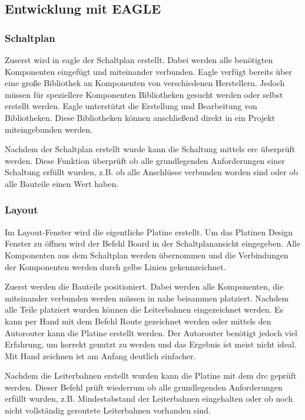\documentclass[a4paper, twoside, 12pt, openright]{memoir}
\begin{document}
\subsection{Entwicklung mit EAGLE}
\subsubsection{Schaltplan}
Zuserst wird in \ac{eagle} der Schaltplan erstellt.
Dabei werden alle benötigten Komponenten eingefügt und miteinander verbunden.
Eagle verfügt bereits über eine große Bibliothek an Komponenten von verschiedenen Herstellern.
Jedoch müssen für speziellere Komponenten Bibliotheken gesucht werden oder selbst erstellt werden.
Eagle unterstützt die Erstellung und Bearbeitung von Bibliotheken.
Diese Bibliotheken können anschließend direkt in ein Projekt miteingebunden werden.\par

Nachdem der Schaltplan erstellt wurde kann die Schaltung mittels \ac{erc} überprüft werden.
Diese Funktion überprüft ob alle grundlegenden Anforderungen einer Schaltung erfüllt wurden, z.B. ob alle Anschlüsse verbunden worden sind oder ob alle Bauteile einen Wert haben.

\subsubsection{Layout}
Im Layout-Fenster wird die eigentliche Platine erstellt.
Um das Platinen Design Fenster zu öffnen wird der Befehl Board in der Schaltplanansicht eingegeben.
Alle Komponenten aus dem Schaltplan werden übernommen und die Verbindungen der Komponenten werden durch gelbe Linien gekennzeichnet.\par

Zuerst werden die Bauteile positioniert. Dabei werden alle Komponenten, die miteinander verbunden werden müssen in nahe beisammen platziert.
Nachdem alle Teile platziert wurden können die Leiterbahnen eingezeichnet werden.
Es kann per Hand mit dem Befehl Route gezeichnet werden oder mittels den Autorouter kann die Platine erstellt werden.
Der Autorouter benötigt jedoch viel Erfahrung, um korrekt genutzt zu werden und das Ergebnis ist meist nicht ideal.
Mit Hand zeichnen ist am Anfang deutlich einfacher.\par

Nachdem die Leiterbahnen erstellt wurden kann die Platine mit dem \ac{drc} geprüft werden.
Dieser Befehl prüft wiederrum ob alle grundlegenden Anforderungen erfüllt wurden, z.B. Mindestabstand der Leiterbahnen eingehalten oder ob noch nicht vollständig geroutete Leiterbahnen vorhanden sind.
\end{document}
